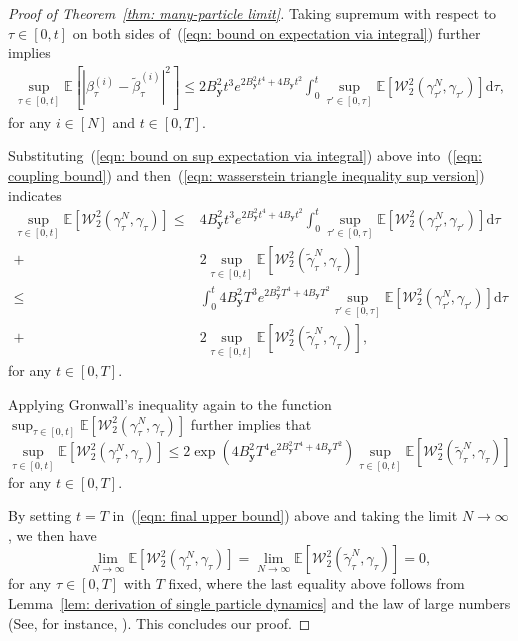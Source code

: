 \documentclass{article}
\numberwithin{equation}{section}
\def\eqref#1{(\ref{#1})}
\newcommand{\dif}{{\mathrm{d}}}
\def\vy{{\bm{y}}}
\def\gW{{\mathcal{W}}}
\newcommand{\E}{\mathbb{E}}
\begin{document}
\begin{proof}[Proof of Theorem~\ref{thm: many-particle limit}]
    Taking supremum with respect to $\tau \in [0,t]$ on both sides of~\eqref{eqn: bound on expectation via integral} further implies 
    \begin{equation}
    \label{eqn: bound on sup expectation via integral}
    \begin{aligned}
    \sup_{\tau \in [0,t]}\E\left[\left|\beta^{(i)}_{\tau} - \widetilde{\beta}^{(i)}_{\tau}\right|^2\right] \leq 2B_{\vy}^2t^3e^{2B_{\vy}^2t^4 + 4B_{\vy}t^2}\int_{0}^{t}\sup_{\tau' \in[0,\tau]}\E\left[\gW^2_2\left(\gamma^N_{\tau'},\gamma_{\tau'}\right)\right]\dif\tau,    
    \end{aligned}    
    \end{equation}
    for any $i \in [N]$ and $t \in [0,T]$. 
    
    Substituting~\eqref{eqn: bound on sup expectation via integral} above into~\eqref{eqn: coupling bound} and then~\eqref{eqn: wasserstein triangle inequality sup version} indicates
    \begin{equation}
    \label{eqn: pre gronwall for the final bound}
    \begin{aligned}
    \sup_{\tau \in [0,t]}\E\left[\gW^2_2(\gamma^{N}_\tau, \gamma_\tau)\right] \leq &4B_{\vy}^2t^3e^{2B_{\vy}^2t^4 + 4B_{\vy}t^2}\int_{0}^{t}\sup_{\tau' \in[0,\tau]}\E\left[\gW^2_2\left(\gamma^N_{\tau'},\gamma_{\tau'}\right)\right]\dif\tau \\
    + &2\sup_{\tau \in [0,t]}\E\left[\gW^2_2(\widetilde{\gamma}^{N}_\tau, \gamma_\tau)\right]\\
    \leq &\int_{0}^{t}4B_{\vy}^2T^3e^{2B_{\vy}^2T^4 + 4B_{\vy}T^2}\sup_{\tau' \in[0,\tau]}\E\left[\gW^2_2\left(\gamma^N_{\tau'},\gamma_{\tau'}\right)\right]\dif\tau \\
    + &2\sup_{\tau \in [0,t]}\E\left[\gW^2_2(\widetilde{\gamma}^{N}_\tau, \gamma_\tau)\right],
    \end{aligned}
    \end{equation}
    for any $t \in [0,T]$. 
    
    Applying Gronwall's inequality again to the function $\sup_{\tau \in [0,t]}\E\left[\gW^2_2(\gamma^{N}_\tau, \gamma_\tau)\right]$ further implies that
    \begin{equation}
    \label{eqn: final upper bound}
    \sup_{\tau \in [0,t]}\E\left[\gW^2_2(\gamma^{N}_\tau, \gamma_\tau)\right] \leq 2\exp\left(4B_{\vy}^2T^4e^{2B_{\vy}^2T^4 + 4B_{\vy}T^2}\right)\sup_{\tau \in [0,t]}\E\left[\gW^2_2(\widetilde{\gamma}^{N}_\tau, \gamma_\tau)\right]
    \end{equation}
    for any $t \in [0,T]$. 
    
    By setting $t=T$ in~\eqref{eqn: final upper bound} above and taking the limit $N \rightarrow \infty$, we then have 
    $$\lim_{N \rightarrow \infty}\E\left[\gW^2_2(\gamma^{N}_\tau, \gamma_\tau)\right] = \lim_{N \rightarrow \infty}\E\left[\gW^2_2(\widetilde{\gamma}^{N}_\tau, \gamma_\tau)\right] =0,$$
    for any $\tau \in [0,T]$ with $T$ fixed, where the last equality above follows from Lemma~\ref{lem: derivation of single particle dynamics} and the law of large numbers (See, for instance, \cite[Corollary 2.14]{lacker2018mean}). This concludes our proof. 
\end{proof}
\end{document}
